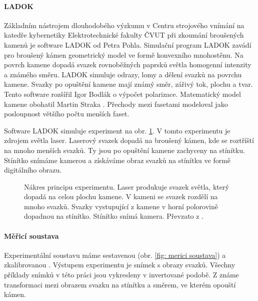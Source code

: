 \paragraph{LADOK}
\hspace{1mm}

Základním nástrojem dlouhodobého výzkumu v Centru strojového vnímání na katedře kybernetiky Elektrotechnické fakulty ČVUT při zkoumání broušených kamenů je software LADOK \cite{Pohl2002} od Petra Pohla. Simulační program LADOK zavádí pro broušený kámen ge\-o\-me\-tri\-cký model ve formě konvexního mnohostěnu. Na povrch kamene dopadá svazek rovnoběžných paprsků světla homogenní intenzity a známého směru. LADOK simuluje odrazy, lomy a dělení svazků na povrchu kamene. Svazky po opuštění kamene mají známý směr, zářivý tok, plochu a tvar. Tento software rozšířil Igor Bodlák \cite{bodlakLADOK} o výpočet polarizace. Matematický model kamene obohatil Martin Straka \cite{strakaLADOK}. Přechody mezi fasetami modeloval jako posloupnost většího počtu menších faset. 

Software LADOK simuluje experiment na obr. \ref{fig:basicMeasure}. V tomto experimentu je zdrojem světla laser. Laserový svazek dopadá na broušený kámen, kde se roztříští na mnoho menších svazků. Ty jsou po opuštění kamene zachyceny na stínítku. Stínítko snímáme kamerou a získáváme obraz svazků na stínítku ve formě digitálního obrazu.  


\begin{figure}[h!]
\begin{center}
\scalebox{0.5}{ }
\end{center}
\caption[Schéma experimentu.]{Nákres principu experimentu. Laser produkuje svazek světla, který dopadá na celou plochu kamene. V kameni se svazek rozdělí na mnoho svazků. Svazky vystupující z kamene v horní polorovině dopadnou na stínítko. Stínítko snímá kamera. Převzato z \cite{Drapela}.}
\label{fig:basicMeasure}
\end{figure}

\newpage
\paragraph{Měřicí soustava}
\hspace{1mm}

Experimentální soustavu máme sestavenou (obr. \ref{fig: merici soustava}) a zkalibrovanou \cite{Drapela}. Výstupem experimentu je snímek s obrazy svazků. Všechny příklady snímků v této práci jsou vykresleny v invertované podobě. Z \cite{Drapela} známe transformaci mezi obrazem svazku na stínítku a směrem, ve kterém opouští kámen. 

